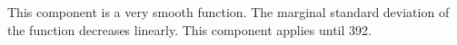This component is a very smooth function.
The marginal standard deviation of the function decreases linearly.
This component applies until  392.